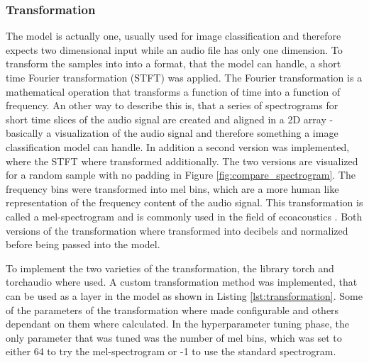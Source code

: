 \subsubsection{Transformation}%
The model is actually one, usually used for image classification and therefore expects
two dimensional input while an audio file has only one dimension. To transform the samples into
into a format, that the model can handle, a short time Fourier transformation  (STFT) was applied.
The Fourier transformation is a mathematical operation that transforms a function of time
into a function of frequency. An other way to describe this is, that a series of spectrograms
for short time slices of the audio signal are created and aligned in a 2D array - basically
a visualization of the audio signal and therefore something a image classification model can handle.
In addition a second version was implemented, where the STFT where transformed additionally.
The two versions are visualized for a random sample with no padding in Figure \ref{fig:compare_spectrogram}.
The frequency bins were transformed into mel bins, which are a more human like representation
of the frequency content of the audio signal. This transformation is called a mel-spectrogram
and is commonly used in the field of ecoacoustics \autocite[7]{stowellComputationalBioacousticsDeep2022}.
Both versions of the transformation where transformed into decibels and normalized before 
being passed into the model.



To implement the two varieties of the transformation, the library torch and torchaudio where used.
A custom transformation method was implemented, that can be used as a layer in the model as shown in 
Listing \ref{lst:transformation}. Some of the parameters of the transformation where made configurable
and others dependant on them where calculated. In the hyperparameter tuning phase, the only parameter
that was tuned was the number of mel bins, which was set to either 64 to try the mel-spectrogram or -1
to use the standard spectrogram.

